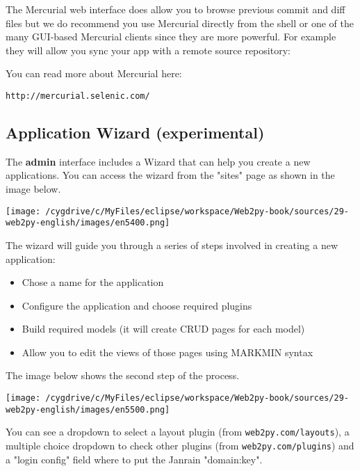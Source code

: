 \documentclass[justified,sixbynine,notoc]{tufte-book}
\def\ft{\small\tt}
\begin{document}
\begin{fullwidth}
The Mercurial web interface does allow you to browse previous commit and diff files but we do recommend you use Mercurial directly from the shell or one of the many GUI-based Mercurial clients since they are more powerful. For example they will allow you sync your app with a remote source repository:

You can read more about Mercurial here:
\begin{lstlisting}[keywords={}]
http://mercurial.selenic.com/
\end{lstlisting}

\goodbreak\subsection{Application Wizard (experimental)}

The {\bf admin} interface includes a Wizard that can help you create a new applications.
You can access the wizard from the "sites" page as shown in the image below.


\goodbreak\begin{center}\texttt{[image: /cygdrive/c/MyFiles/eclipse/workspace/Web2py-book/sources/29-web2py-english/images/en5400.png]}\end{center}


The wizard will guide you through a series of steps involved in creating a new application:

\begin{itemize}
\item Chose a name for the application

\item Configure the application and choose required plugins

\item Build required models (it will create CRUD pages for each model)

\item Allow you to edit the views of those pages using MARKMIN syntax
\end{itemize}

The image below shows the second step of the process.


\goodbreak\begin{center}\texttt{[image: /cygdrive/c/MyFiles/eclipse/workspace/Web2py-book/sources/29-web2py-english/images/en5500.png]}\end{center}


You can see a dropdown to select a layout plugin (from {\ft web2py.com/layouts}), a multiple choice dropdown to check other plugins (from {\ft web2py.com/plugins}) and a "login config" field where to put the Janrain "domain:key".


\end{fullwidth}
\end{document}
